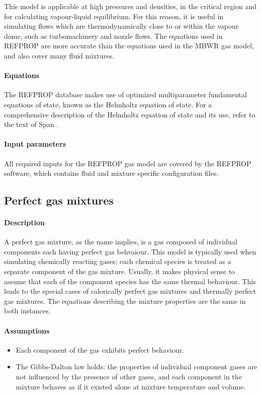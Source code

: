 This model is applicable at high pressures and densities, in the critical region and
for calculating vapour-liquid equilibrium. For this reason, it is useful in
simulating flows which are thermodynamically close to or within the vapour dome,
such as turbomachinery and nozzle flows. The equations used in REFPROP are
more accurate than the equations used in the MBWR gas model, and also cover
many fluid mixtures.

\paragraph{Equations}
The REFPROP database makes use of optimized multiparameter fundamental equations
of state, known as the Helmholtz equation of state. For a comprehensive description of
the Helmholtz equation of state and its use, refer to the text of Span \cite{span2000multiparameter}.

\paragraph{Input parameters}
All required inputs for the REFPROP gas model are covered by the REFPROP software,
which contains fluid and mixture specific configuration files.

\subsection{Perfect gas mixtures}
\label{sec:pgm}
\paragraph{Description}
A perfect gas mixture, as the name implies, is a gas composed
of individual components each having perfect gas behvaiour.
This model is typically used when simulating chemically
reacting gases; each chemical species is treated as a separate
component of the gas mixture.
Usually, it makes physical sense to assume that each of the component species
has the same thermal behaviour.
This leads to the special cases of calorically perfect gas mixtures and
thermally perfect gas mixtures.
The equations describing the mixture properties are the same in both
instances. 

\paragraph{Assumptions}
\begin{itemize}
\item Each component of the gas exhibits perfect behaviour.
\item The Gibbs-Dalton law holds: the properties of individual
      component gases are not influenced by the presence of
      other gases, and each component in the mixture behaves
      as if it existed alone at mixture temperature and volume.
\end{itemize}


